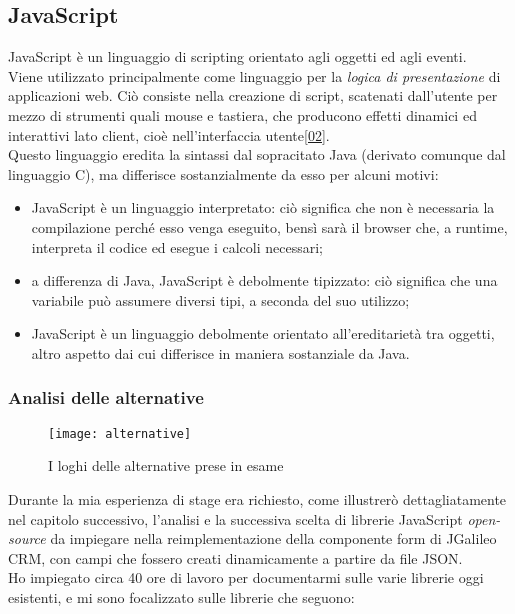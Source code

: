 \subsection{JavaScript}
JavaScript è un linguaggio di scripting orientato agli oggetti ed agli eventi.\\
Viene utilizzato principalmente come linguaggio per la \emph{logica di presentazione} di applicazioni web. Ciò consiste nella creazione di \gls{script}\glsfirstoccur, scatenati dall'utente per mezzo di strumenti quali mouse e tastiera, che producono effetti dinamici ed interattivi lato client, cioè nell'interfaccia utente\hyperlink{02}{[02]}.\\
Questo linguaggio eredita la sintassi dal sopracitato Java (derivato comunque dal linguaggio C), ma differisce sostanzialmente da esso per alcuni motivi:
\begin{itemize}
	\item JavaScript è un linguaggio interpretato: ciò significa che non è necessaria la compilazione perché esso venga eseguito, bensì sarà il browser che, a runtime, interpreta il codice ed esegue i calcoli necessari;\\
	\item a differenza di Java, JavaScript è debolmente tipizzato: ciò significa che una variabile può assumere diversi tipi, a seconda del suo utilizzo;\\
	\item JavaScript è un linguaggio debolmente orientato all'ereditarietà tra oggetti, altro aspetto dai cui differisce in maniera sostanziale da Java. \\
\end{itemize}

\newpage

\subsubsection{Analisi delle alternative}

\begin{figure}[h]
	\centering
	\texttt{[image: alternative]}
	\caption{I loghi delle alternative prese in esame}
\end{figure}

Durante la mia esperienza di stage era richiesto, come illustrerò dettagliatamente nel capitolo successivo, l'analisi e la successiva scelta di librerie JavaScript \emph{open-source} da impiegare nella reimplementazione della componente form di JGalileo CRM, con campi che fossero creati dinamicamente a partire da file JSON. \\ 
Ho impiegato circa 40 ore di lavoro per documentarmi sulle varie librerie oggi esistenti, e mi sono focalizzato sulle librerie che seguono:
